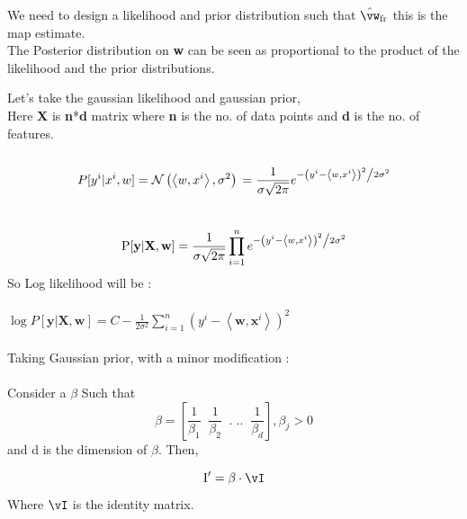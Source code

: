 \documentclass[a4paper,11pt]{article}
\begin{document}
\begin{mlsolution}
We need to design a likelihood and prior distribution such that $\hat\vw_\text{fr}$ this is the map estimate.
\\The Posterior distribution on \textbf{w} can be seen as proportional to the product of the likelihood and the prior distributions.

Let's take the gaussian likelihood and gaussian prior,
\\Here \textbf
X
 is \textbf{n}*\textbf{d} matrix where \textbf{n} is the no. of data points and \textbf{d} is the no. of features.
\\\\
\[
P[y^{i}|x^{i}, w] = \mathcal{N} \left ( \left \langle w, x^{i} \right \rangle, \sigma^{2} \right ) 
\\
= \frac{1}{{\sigma \sqrt {2\pi } }}e^{{{ - \left( {y^{i} - \left \langle w, x^{i} \right \rangle } \right)^2 } \mathord{\left/ {\vphantom {{ - \left( {y^{i} - \left \langle w, x^{i} \right \rangle } \right)^2 } {2\sigma ^2 }}} \right. \kern-\nulldelimiterspace} {2\sigma ^2 }}}
\]\\

\[
\text{P}[\textbf{y} | \textbf{X}, \textbf{w}] =  \frac{1}{{\sigma \sqrt {2\pi } }} \prod_{i=1}^{n} e^{{{ - \left( {y^{i} - \left \langle w, x^{i} \right \rangle } \right)^2 } \mathord{\left/ {\vphantom {{ - \left( {y^{i} - \left \langle w, x^{i} \right \rangle } \right)^2 } {2\sigma ^2 }}} \right. \kern-\nulldelimiterspace} {2\sigma ^2 }}}

\]
So Log likelihood will be :
\\\\
\begin{math}
\log P[\textbf{y} | \textbf{X}, \textbf{w}] = C - \frac{1}{2\sigma^{2}} \sum_{i = 1}^{n} \left ( y^{i} - \left \langle \textbf{w}, \textbf{x}^{i} \right \rangle \right )^{2}
\end{math}
\\\\Taking Gaussian prior, with a minor modification :\\\\Consider a \begin{math} \beta \end{math} Such that \[ \beta = \left [ \frac{1}{\beta_{1}}\;\; \frac{1}{\beta_{2}}\;\; .\;..  \;\;\frac{1}{\beta_{d}} \right ] , \beta_{j} > 0\] and d is the dimension of $\beta$. \;Then,

 \[ \text{I}{}' = \beta\cdot\vI\] Where $\vI$ is the identity matrix.\\


\end{mlsolution}
\end{document}
